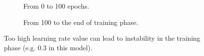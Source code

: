 \documentclass[11pt]{article}
\begin{document}
\begin{figure}[H]
    \centering
    \begin{subfigure}[b]{0.45\textwidth}
        \centering
        \vspace{-0.74cm}
         \caption{From 0 to 100 epochs.}
         \label{fig:lr_inst_1}
    \end{subfigure}
    \hfill
    \begin{subfigure}[b]{0.45\textwidth}
        \centering
        \vspace{-0.74cm}
         \caption{From 100 to the end of training phase.}
         \label{fig:lr_inst_2}
     \end{subfigure}
        \vspace{-0.16cm}
\caption{Too high learning rate value can lead to instability in the training phase (e.g. 0.3 in this model).}
\label{fig:learning_rate_instability}
\end{figure}
\end{document}
